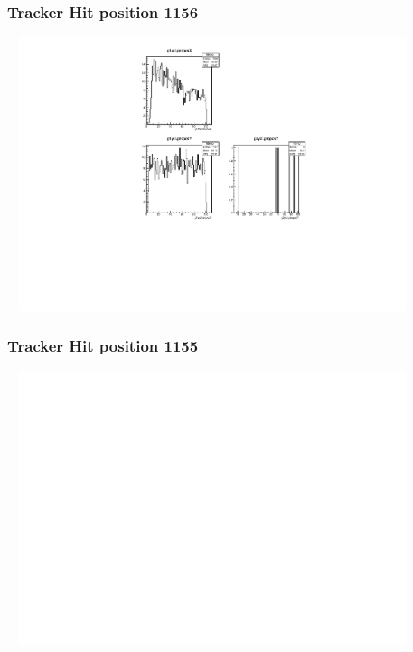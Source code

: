\documentclass[slidestop,compress,mathserif]{beamer}
\begin{document}
\begin{frame}\frametitle{Tracker Hit position 1156}
	 \includegraphics[width=12cm,height=8cm]{Tracker_Hit_position_1156.pdf}
\end{frame}
\begin{frame}\frametitle{Tracker Hit position 1155}
	 \includegraphics[width=12cm,height=8cm]{Tracker_Hit_position_1155.pdf}
\end{frame}
\end{document}
